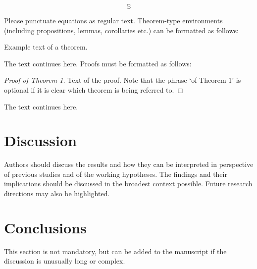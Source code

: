 \documentclass[bioengineering,article,submit,moreauthors,pdftex,10pt,a4paper]{mdpi}
\begin{document}
\begin{equation}
\mathbb{S}
\end{equation}

Please punctuate equations as regular text. Theorem-type environments (including propositions, lemmas, corollaries etc.) can be formatted as follows:
\begin{Theorem}
Example text of a theorem.
\end{Theorem}

The text continues here. Proofs must be formatted as follows:

\begin{proof}[Proof of Theorem 1]
Text of the proof. Note that the phrase `of Theorem 1' is optional if it is clear which theorem is being referred to.
\end{proof}
The text continues here.


\section{Discussion}

Authors should discuss the results and how they can be interpreted in perspective of previous studies and of the working hypotheses. The findings and their implications should be discussed in the broadest context possible. Future research directions may also be highlighted.


\section{Conclusions}

This section is not mandatory, but can be added to the manuscript if the discussion is unusually long or complex.

\vspace{6pt} 





\end{document}
